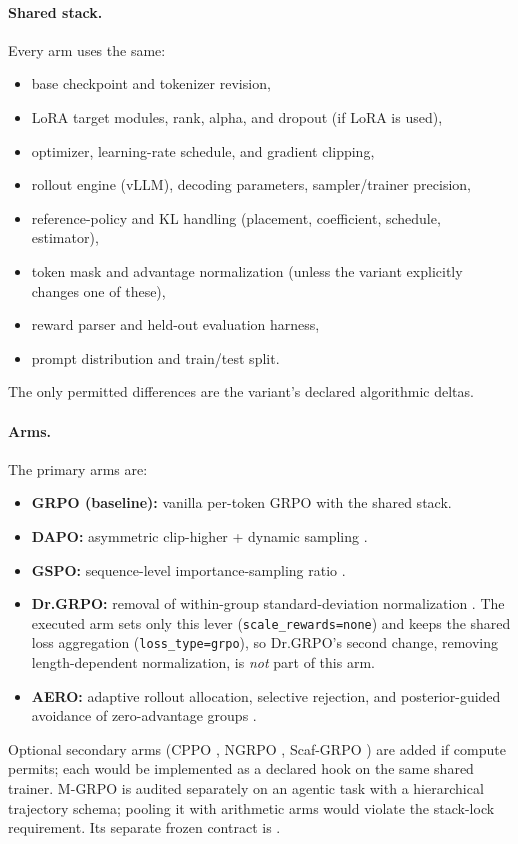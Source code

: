 \documentclass[11pt]{article}
\newcommand{\grpo}{\textsc{GRPO}}
\begin{document}
\paragraph{Shared stack.} Every arm uses the same:
\begin{itemize}[leftmargin=1.4em, itemsep=2pt]
  \item base checkpoint and tokenizer revision,
  \item LoRA target modules, rank, alpha, and dropout (if LoRA is used),
  \item optimizer, learning-rate schedule, and gradient clipping,
  \item rollout engine (vLLM), decoding parameters, sampler/trainer precision,
  \item reference-policy and KL handling (placement, coefficient, schedule,
    estimator),
  \item token mask and advantage normalization (unless the variant explicitly
    changes one of these),
  \item reward parser and held-out evaluation harness,
  \item prompt distribution and train/test split.
\end{itemize}
The only permitted differences are the variant's declared algorithmic deltas.

\paragraph{Arms.} The primary arms are:
\begin{itemize}[leftmargin=1.4em, itemsep=2pt]
  \item \textbf{GRPO (baseline):} vanilla per-token GRPO with the shared stack.
  \item \textbf{DAPO:} asymmetric clip-higher + dynamic sampling
    \cite{yu2025dapo}.
  \item \textbf{GSPO:} sequence-level importance-sampling ratio
    \cite{qwen2025gspo}.
  \item \textbf{Dr.\grpo{}:} removal of within-group standard-deviation
    normalization \cite{tong2025drgrpo}. The executed arm sets only this
    lever (\texttt{scale\_rewards=none}) and keeps the shared loss aggregation
    (\texttt{loss\_type=grpo}), so Dr.\grpo{}'s second change, removing
    length-dependent normalization, is \emph{not} part of this arm.
  \item \textbf{AERO:} adaptive rollout allocation, selective rejection, and
    posterior-guided avoidance of zero-advantage groups \cite{zhang2026aero}.
\end{itemize}
Optional secondary arms (CPPO \cite{lin2025cppo}, NGRPO
\cite{nan2025ngrpo}, Scaf-\grpo{} \cite{zhang2025scaffgrpo}) are added if compute
permits; each would be implemented as a declared hook on the same shared trainer.
M-\grpo{} \cite{hong2025mgrpo} is audited separately on an agentic task with a
hierarchical trajectory schema; pooling it with arithmetic arms would violate
the stack-lock requirement. Its separate frozen contract is
.
\end{document}
